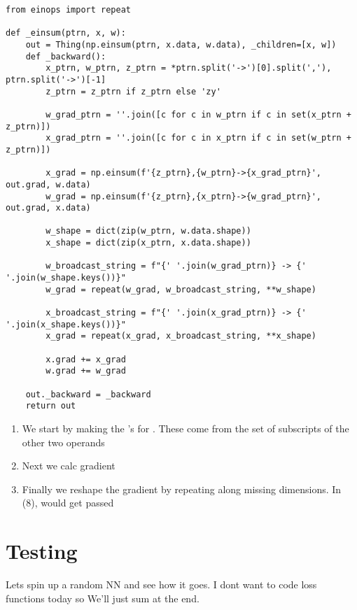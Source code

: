 \documentclass[11pt]{article}
\begin{document}
\begin{verbatim}
from einops import repeat

def _einsum(ptrn, x, w):
    out = Thing(np.einsum(ptrn, x.data, w.data), _children=[x, w])
    def _backward():
        x_ptrn, w_ptrn, z_ptrn = *ptrn.split('->')[0].split(','), ptrn.split('->')[-1]
        z_ptrn = z_ptrn if z_ptrn else 'zy'

        w_grad_ptrn = ''.join([c for c in w_ptrn if c in set(x_ptrn + z_ptrn)])
        x_grad_ptrn = ''.join([c for c in x_ptrn if c in set(w_ptrn + z_ptrn)])
        
        x_grad = np.einsum(f'{z_ptrn},{w_ptrn}->{x_grad_ptrn}', out.grad, w.data)
        w_grad = np.einsum(f'{z_ptrn},{x_ptrn}->{w_grad_ptrn}', out.grad, x.data)

        w_shape = dict(zip(w_ptrn, w.data.shape))
        x_shape = dict(zip(x_ptrn, x.data.shape))

        w_broadcast_string = f"{' '.join(w_grad_ptrn)} -> {' '.join(w_shape.keys())}"
        w_grad = repeat(w_grad, w_broadcast_string, **w_shape)

        x_broadcast_string = f"{' '.join(x_grad_ptrn)} -> {' '.join(x_shape.keys())}"
        x_grad = repeat(x_grad, x_broadcast_string, **x_shape)

        x.grad += x_grad
        w.grad += w_grad

    out._backward = _backward
    return out
\end{verbatim}
\begin{enumerate}
    \item We start by making the 's for . These come from the set 
    of subscripts of the other two operands
    \item Next we calc gradient
    \item Finally we reshape the gradient by repeating along missing dimensions.
    In (8),  would get passed 
\end{enumerate}
\section*{Testing}
Lets spin up a random NN and see how it goes. I dont want to code loss functions today so 
We'll just sum at the end. 
\end{document}
